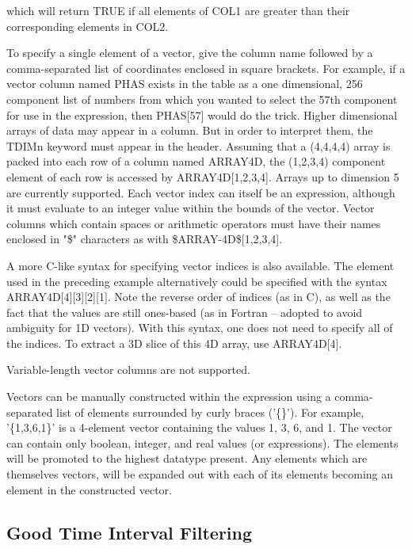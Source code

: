 \documentclass[11pt]{book}
\begin{document}
    which will return TRUE if all elements  of  COL1  are  greater  than
    their corresponding elements in COL2.

    To  specify  a  single  element  of  a  vector, give the column name
    followed by  a  comma-separated  list  of  coordinates  enclosed  in
    square  brackets.  For example, if a vector column named PHAS exists
    in the table as a one dimensional, 256  component  list  of  numbers
    from  which  you  wanted to select the 57th component for use in the
    expression, then PHAS[57] would do the  trick.   Higher  dimensional
    arrays  of  data  may appear in a column.  But in order to interpret
    them, the TDIMn keyword must appear in the header.  Assuming that  a
    (4,4,4,4)  array  is packed into each row of a column named ARRAY4D,
    the  (1,2,3,4)  component  element  of  each  row  is  accessed   by
    ARRAY4D[1,2,3,4].    Arrays   up   to   dimension  5  are  currently
    supported.  Each vector index can itself be an expression,  although
    it  must  evaluate  to  an  integer  value  within the bounds of the
    vector.  Vector columns which contain spaces or arithmetic operators
    must   have   their   names  enclosed  in  "\$"  characters  as  with
    \$ARRAY-4D\$[1,2,3,4].

    A  more  C-like  syntax  for  specifying  vector  indices  is   also
    available.   The element used in the preceding example alternatively
    could be specified with the syntax  ARRAY4D[4][3][2][1].   Note  the
    reverse  order  of  indices  (as in C), as well as the fact that the
    values are still ones-based (as  in  Fortran  --  adopted  to  avoid
    ambiguity  for  1D vectors).  With this syntax, one does not need to
    specify all of the indices.  To  extract  a  3D  slice  of  this  4D
    array, use ARRAY4D[4].

    Variable-length vector columns are not supported.

    Vectors can  be manually constructed  within the expression  using a
    comma-separated list of  elements surrounded by curly braces ('\{\}').
    For example, '\{1,3,6,1\}' is a 4-element vector containing the values
    1, 3, 6, and 1.  The  vector can contain  only boolean, integer, and
    real values (or expressions).  The elements will  be promoted to the
    highest  datatype   present.  Any   elements   which  are themselves
    vectors, will be expanded out with  each of its elements becoming an
    element in the constructed vector.


\subsection{Good Time Interval Filtering}
\end{document}
